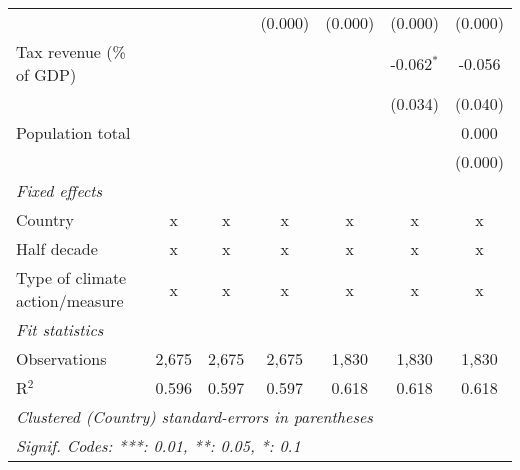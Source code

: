 \begin{tabular}{lcccccc}
                                                                         &               &                & (0.000)        & (0.000)        & (0.000)        & (0.000)\\   
   Tax revenue (\% of GDP)                                               &               &                &                &                & -0.062$^{*}$   & -0.056\\   
                                                                         &               &                &                &                & (0.034)        & (0.040)\\   
   Population total                                                      &               &                &                &                &                & 0.000\\   
                                                                         &               &                &                &                &                & (0.000)\\   
   \emph{Fixed effects}\\
   Country                                                               & x             & x              & x              & x              & x              & x\\  
   Half decade                                                           & x             & x              & x              & x              & x              & x\\  
   Type of climate action/measure                                        & x             & x              & x              & x              & x              & x\\  
   \midrule \emph{Fit statistics}\\
   Observations                                                          & 2,675         & 2,675          & 2,675          & 1,830          & 1,830          & 1,830\\  
   R$^2$                                                                 & 0.596         & 0.597          & 0.597          & 0.618          & 0.618          & 0.618\\  
   \midrule
   \multicolumn{7}{l}{\emph{Clustered (Country) standard-errors in parentheses}}\\
   \multicolumn{7}{l}{\emph{Signif. Codes: ***: 0.01, **: 0.05, *: 0.1}}\\
\end{tabular}
\par\endgroup


